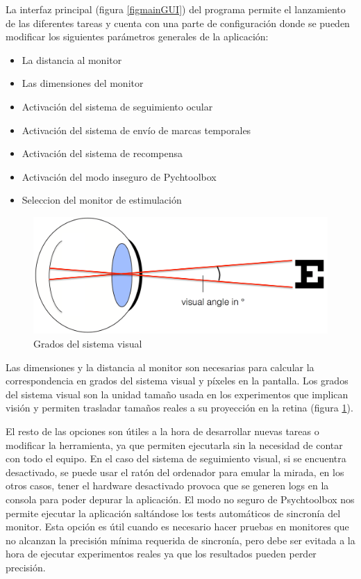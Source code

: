 \documentclass[conference]{IEEEtran}
\begin{document}
La interfaz principal (figura \ref{figmainGUI}) del programa permite el lanzamiento de las diferentes tareas y cuenta con una parte de configuración donde se pueden modificar los siguientes parámetros generales de la aplicación:
\begin{itemize}
	\item La distancia al monitor
	\item Las dimensiones del monitor
	\item Activación del sistema de seguimiento ocular
	\item Activación del sistema de envío de marcas temporales
	\item Activación del sistema de recompensa
	\item Activación del modo inseguro de Pychtoolbox
	\item Seleccion del monitor de estimulación
\end{itemize} 

\begin{figure}[htbp]
\centerline{\includegraphics[width=\linewidth]{figures/visual_degrees}}
\caption{Grados del sistema visual}
\label{figvisualDegrees}
\end{figure}

Las dimensiones y la distancia al monitor son necesarias para calcular la correspondencia en grados del sistema visual y píxeles en la pantalla. Los grados del sistema visual son la unidad tamaño usada en los experimentos que implican visión y permiten trasladar tamaños reales a su proyección en la retina (figura \ref{figvisualDegrees}).

El resto de las opciones son útiles a la hora de desarrollar nuevas tareas o modificar la herramienta, ya que permiten ejecutarla sin la necesidad de contar con todo el equipo. En el caso del sistema de seguimiento visual, si se encuentra desactivado, se puede usar el ratón del ordenador para emular la mirada, en los otros casos, tener el hardware desactivado provoca que se generen logs en la consola para poder depurar la aplicación.
El modo no seguro de Psychtoolbox nos permite ejecutar la aplicación saltándose los tests automáticos de sincronía del monitor. Esta opción es útil cuando es necesario hacer pruebas en monitores que no alcanzan la precisión mínima requerida de sincronía, pero debe ser evitada a la hora de ejecutar experimentos reales ya que los resultados pueden perder precisión.
\end{document}

